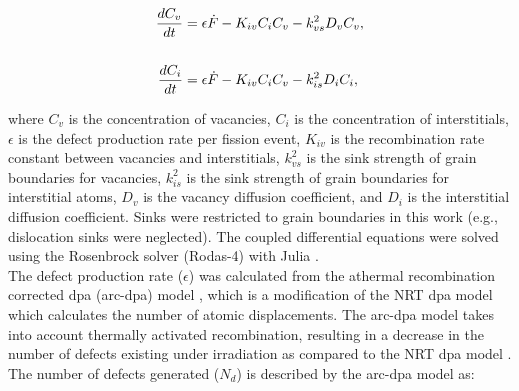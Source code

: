 \documentclass[preprint,12pt]{elsarticle}
\begin{document}
\begin{align} 
\label{eqn:UMoratetheory1}
\frac{dC_{v}}{dt}={}&\epsilon\dot{F}- K_{iv}C_{i}C_{v} - k_{vs}^{2}D_{v}C_{v}, \\
\notag\\
\label{eqn:UMoratetheory2}
\frac{dC_{i}}{dt}={}&\epsilon\dot{F} - K_{iv}C_{i}C_{v} - k_{is}^{2}D_{i}C_{i}, 
\end{align}

\noindent where $C_{v}$ is the concentration of vacancies, $C_{i}$ is the concentration of interstitials, $\epsilon$ is the defect production rate per fission event, $K_{iv}$ is the recombination rate constant between vacancies and interstitials, $k_{vs}^{2}$ is the sink strength of grain boundaries for vacancies, $k_{is}^{2}$ is the sink strength of grain boundaries for interstitial atoms, $D_{v}$ is the vacancy diffusion coefficient, and $D_{i}$ is the interstitial diffusion coefficient. Sinks were restricted to grain boundaries in this work (e.g., dislocation sinks were neglected). The coupled differential equations were solved using the Rosenbrock solver (Rodas-4) with Julia \cite{wanner1996solving, bezanson2017julia}.\\ 
\indent The defect production rate ($\epsilon$) was calculated from the athermal recombination corrected dpa (arc-dpa) model \cite{nordlund2018improving}, which is a modification of the NRT dpa model \cite{norgett1975proposed} which calculates the number of atomic displacements. The arc-dpa model takes into account thermally activated recombination, resulting in a decrease in the number of defects existing under irradiation as compared to the NRT dpa model \cite{nordlund2018improving}. The number of defects generated ($N_{d}$) is described by the arc-dpa model as:\\
\end{document}
